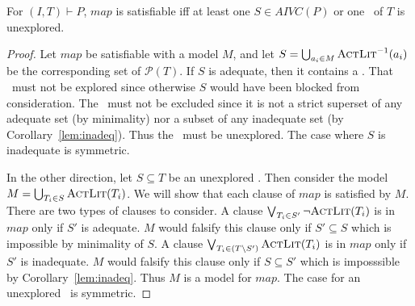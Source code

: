 \begin{lemma}
\label{lem:map:comp}
For $(I, T) \vdash P$, $map$ is satisfiable iff
at least one $S \in AIVC(P)$ or one \mis\ of $T$ is unexplored.
\end{lemma}
\begin{proof}
Let $map$ be satisfiable with a model $M$, and let $S = \bigcup_{a_i
  \in M} \textsc{ActLit} ^{-1} (a_i)$ be the corresponding set of
$\mathcal{P}(T)$. If $S$ is adequate, then it contains a \mivc. That
\mivc\ must not be explored since otherwise $S$ would have been blocked
from consideration. The \mivc\ must not be excluded since it is not a
strict superset of any adequate set (by minimality) nor a subset of
any inadequate set (by Corollary~\ref{lem:inadeq}). Thus the \mivc\ must
be unexplored. The case where $S$ is inadequate is symmetric.

In the other direction, let $S \subseteq T$ be an unexplored \mivc.
Then consider the model $M = \bigcup_{T_i\in S} \textsc{ActLit}(T_i)$. We will
show that each clause of $map$ is satisfied by $M$. There are two
types of clauses to consider. A clause $\bigvee_{T_{i}\in S'} \neg
{\textsc{ActLit}(T_i)}$ is in $map$ only if $S'$ is adequate. $M$ would
falsify this clause only if $S' \subseteq S$ which is impossible by
minimality of $S$. A clause $\bigvee_{T_{i}\in (T \setminus S')}
\textsc{ActLit} (T_i)$ is in $map$ only if $S'$ is inadequate. $M$ would
falsify this clause only if $S \subseteq S'$ which is imposssible by
Corollary~\ref{lem:inadeq}. Thus $M$ is a model for $map$. The case
for an unexplored \mis\ is symmetric.
\end{proof}



